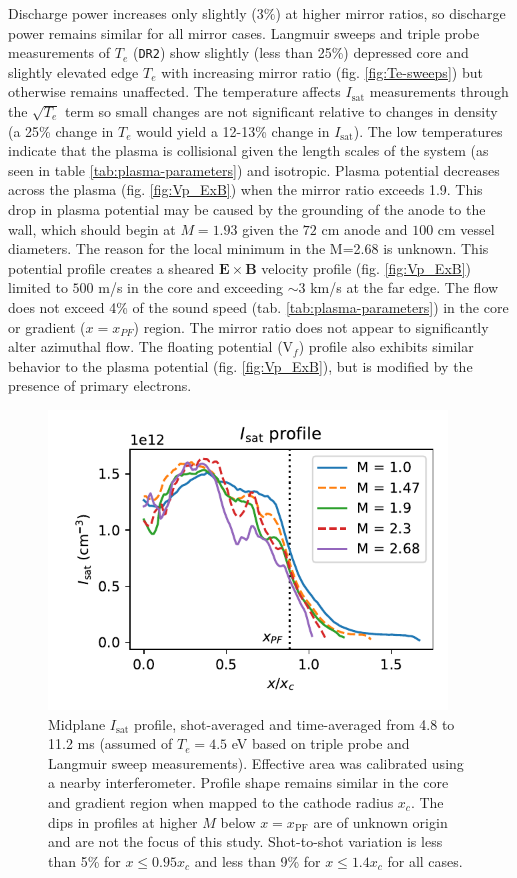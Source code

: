 Discharge power increases only slightly ($3\%$) at higher mirror ratios, so discharge power remains similar for all mirror cases. Langmuir sweeps and triple probe measurements of $T_e$ (\texttt{DR2}) show slightly (less than 25\%) depressed core and slightly elevated edge $T_e$ with increasing mirror ratio (fig. \ref{fig:Te-sweeps}) but otherwise remains unaffected. The temperature affects $I_\text{sat}$ measurements through the $\sqrt{T_e}$ term so small changes are not significant relative to changes in density (a 25\% change in $T_e$ would yield a 12-13\% change in $I_\text{sat}$). The low temperatures indicate that the plasma is collisional given the length scales of the system (as seen in table \ref{tab:plasma-parameters}) and isotropic. Plasma potential decreases across the plasma (fig. \ref{fig:Vp_ExB}) when the mirror ratio exceeds 1.9. This drop in plasma potential may be caused by the grounding of the anode to the wall, which should begin at $M=1.93$ given the $72$ cm anode and $100$ cm vessel diameters. The reason for the local minimum in the M=2.68 is unknown. This potential profile creates a sheared $\boldsymbol{E \times B}$ velocity profile (fig. \ref{fig:Vp_ExB}) limited to $500$ m/s in the core and exceeding $\sim 3$ km/s at the far edge. The flow does not exceed 4\% of the sound speed (tab. \ref{tab:plasma-parameters}) in the core or gradient ($x=x_{PF}$) region. The mirror ratio does not appear to significantly alter azimuthal flow. The floating potential (V$_f$) profile also exhibits similar behavior to the plasma potential (fig. \ref{fig:Vp_ExB}), but is modified by the presence of primary electrons. 



\begin{figure}
    \centering
    \includegraphics[width=300pt]{figures/fig3.pdf}
    \caption[Midplane $I_\text{sat}$ profile]{Midplane $I_\text{sat}$ profile, shot-averaged and time-averaged from 4.8 to 11.2 ms (assumed of $T_e = 4.5$ eV based on triple probe and Langmuir sweep measurements). Effective area was calibrated using a nearby interferometer. Profile shape remains similar in the core and gradient region when mapped to the cathode radius $x_c$. The dips in profiles at higher $M$ below $x=x_\text{PF}$ are of unknown origin and are not the focus of this study. Shot-to-shot variation is less than 5\% for $x \leq 0.95 x_c$ and less than 9\% for $x \leq 1.4 x_c$ for all cases.}
    \label{fig:isat_profile}
\end{figure}

